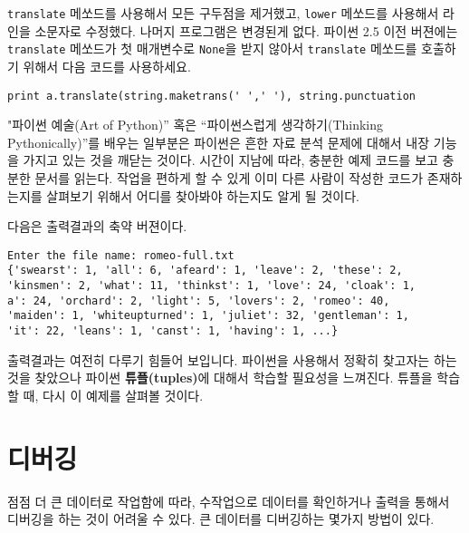 {\tt translate} 메쏘드를 사용해서 모든 구두점을 제거했고, {\tt lower} 메쏘드를 사용해서 라인을 소문자로 수정했다.
나머지 프로그램은 변경된게 없다. 
파이썬 2.5 이전 버젼에는 {\tt translate} 메쏘드가 첫 매개변수로 {\tt None}을 받지 않아서
{\tt translate} 메쏘드를 호출하기 위해서 다음 코드를 사용하세요.

\beforeverb
\begin{verbatim}
print a.translate(string.maketrans(' ',' '), string.punctuation
\end{verbatim}
\afterverb
%

"파이썬 예술(Art of Python)'' 혹은 ``파이썬스럽게 생각하기(Thinking Pythonically)''를 배우는 일부분은
파이썬은 흔한 자료 분석 문제에 대해서 내장 기능을 가지고 있는 것을 깨닫는 것이다.
시간이 지남에 따라, 충분한 예제 코드를 보고 충분한 문서를 읽는다. 
작업을 편하게 할 수 있게 이미 다른 사람이 작성한 코드가 존재하는지를 살펴보기 위해서 어디를 찾아봐야 하는지도 알게 될 것이다.

다음은 출력결과의 축약 버젼이다.

\beforeverb
\begin{verbatim}
Enter the file name: romeo-full.txt
{'swearst': 1, 'all': 6, 'afeard': 1, 'leave': 2, 'these': 2, 
'kinsmen': 2, 'what': 11, 'thinkst': 1, 'love': 24, 'cloak': 1, 
a': 24, 'orchard': 2, 'light': 5, 'lovers': 2, 'romeo': 40, 
'maiden': 1, 'whiteupturned': 1, 'juliet': 32, 'gentleman': 1, 
'it': 22, 'leans': 1, 'canst': 1, 'having': 1, ...}
\end{verbatim}
\afterverb
%

출력결과는 여전히 다루기 힘들어 보입니다. 
파이썬을 사용해서 정확히 찾고자는 하는 것을 찾았으나 파이썬 {\bf 튜플(tuples)}에 대해서 학습할 필요성을 느껴진다.
튜플을 학습할 때, 다시 이 예제를 살펴볼 것이다.

\section{디버깅}

점점 더 큰 데이터로 작업함에 따라, 수작업으로 데이터를 확인하거나 출력을 통해서 디버깅을 하는 것이 어려울 수 있다.
큰 데이터를 디버깅하는 몇가지 방법이 있다.


